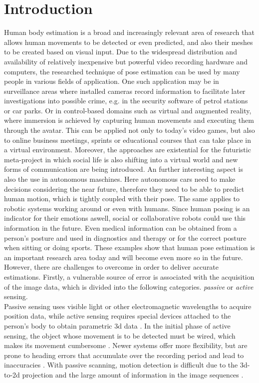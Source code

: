 \section{Introduction}
Human body estimation is a broad and increasingly relevant area of research that allows human movements to be detected or even predicted, and also their meshes to be created based on visual input. Due to the widespread distribution and availability of relatively inexpensive but powerful video recording hardware and computers, the researched technique of pose estimation can be used by many people in various fields of application. One such application may be in surveillance areas where installed cameras record information to facilitate later investigations into possible crime, e.g. in the security software of petrol stations or car parks. Or in control-based domains such as  virtual and augmented reality, where immersion is achieved by capturing human movements and executing them through the avatar. This can be applied not only to today's video games, but also to online business meetings, sprints or educational courses that can take place in a virtual environment. Moreover, the approaches are existential for the futuristic meta-project in which social life is also shifting into a virtual world and new forms of communication are being introduced. An further interesting aspect is also the use in autonomous maschines. Here autonomous cars need to make decisions considering the near future, therefore they need to be able to predict human motion, which is tightly coupled with their pose. The same applies to robotic systems working around or even with humans. Since human posing is an indicator for their emotions aswell, social or collaborative robots could use this information in the future. Even medical information can be obtained from a person's posture and used in diagnostics and therapy or for the correct posture when sitting or doing sports. These examples show that human pose estimation is an important research area today and will become even more so in the future. However, there are challenges to overcome in order to deliver accurate estimations. Firstly, a vulnerable source of error is associated with the acquisition of the image data, which is divided into the following categories. \emph{passive} or \emph{active} sensing. 
\\
Passive sensing uses visible light or other electromagnetic wavelengths to acquire position data, while active sensing requires special devices attached to the person's body to obtain parametric 3d data \cite{summary80s}. In the initial phase of active sensing, the object whose movement is to be detected must be wired, which makes its movement cumbersome \cite{mocap}. Newer systems offer more flexibility, but are prone to heading errors that accumulate over the recording period and lead to inaccuracies \cite{vip}. With passive scanning, motion detection is difficult due to the 3d-to-2d projection and the large amount of information in the image sequences \cite{mocap}.
